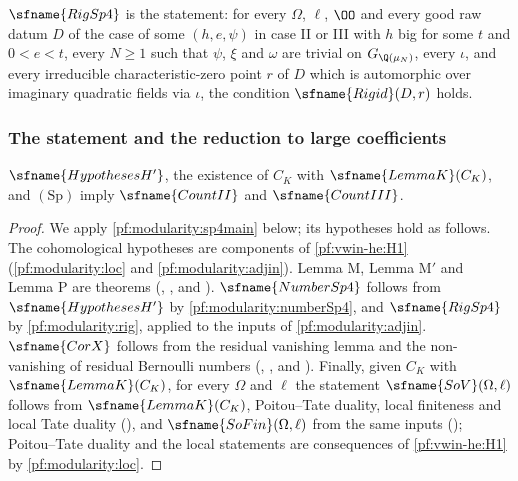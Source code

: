 \begin{definition}[Rigidity]\label{pf:modularity:rigdef}
$\sfname{RigSp4}$ is the statement: for every $\Omega$, $\ell$, $\OO$ and every good raw datum $D$ of the case of some
$(h,e,\psi)$ in case II or III with $h$ big for some $t$ and $0<e<t$, every $N\ge1$ such that $\psi$, $\xi$ and $\omega$
are trivial on $G_{\Q(\mu_N)}$, every $\iota$, and every irreducible characteristic-zero point $r$ of $D$ which is
automorphic over imaginary quadratic fields via $\iota$, the condition $\sfname{Rigid}(D,r)$ holds.
\end{definition}

\subsubsection{The statement and the reduction to large coefficients}

\begin{theorem}\label{pf:modularity:count23}
$\sfname{HypothesesH'}$, the existence of $C_K$ with $\sfname{LemmaK}(C_K)$, and $(\mathrm{Sp})$ imply $\sfname{CountII}$
and $\sfname{CountIII}$.
\end{theorem}

\begin{proof}
We apply \cref{pf:modularity:sp4main} below; its hypotheses hold as follows. The cohomological hypotheses are components
of \ref{pf:vwin-he:H1} (\cref{pf:modularity:loc} and \cref{pf:modularity:adjin}). Lemma M, Lemma M$'$ and Lemma P are
theorems (, , and ).
$\sfname{NumberSp4}$ follows from $\sfname{HypothesesH'}$ by \cref{pf:modularity:numberSp4}, and $\sfname{RigSp4}$ by
\cref{pf:modularity:rig}, applied to the inputs of \cref{pf:modularity:adjin}. $\sfname{CorX}$ follows from the
residual vanishing lemma and the non-vanishing of residual Bernoulli numbers
(, , and ).
Finally, given $C_K$ with $\sfname{LemmaK}(C_K)$, for every $\Omega$ and $\ell$ the statement $\sfname{SoV}(\Omega,\ell)$
follows from $\sfname{LemmaK}(C_K)$, Poitou--Tate duality, local finiteness and local Tate duality
(), and $\sfname{SoFin}(\Omega,\ell)$ from the same inputs
(); Poitou--Tate duality and the local statements are consequences of
\ref{pf:vwin-he:H1} by \cref{pf:modularity:loc}.
\end{proof}


